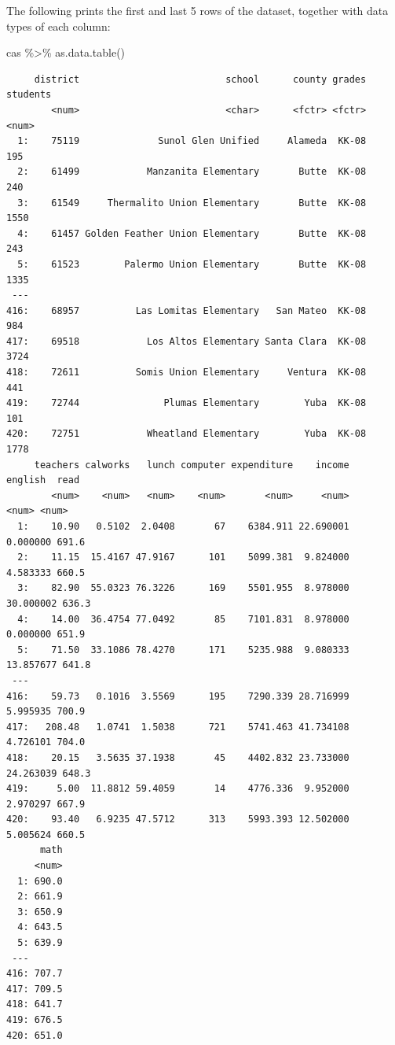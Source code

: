 \documentclass[
  12pt,
  letterpaper,
]{scrbook}
\newenvironment{Shaded}{\begin{snugshade}}{\end{snugshade}}
\newcommand{\FunctionTok}[1]{\textcolor[rgb]{0.28,0.35,0.67}{#1}}
\newcommand{\NormalTok}[1]{\textcolor[rgb]{0.00,0.23,0.31}{#1}}
\newcommand{\SpecialCharTok}[1]{\textcolor[rgb]{0.37,0.37,0.37}{#1}}
\theoremstyle{definition}
\theoremstyle{plain}
\theoremstyle{remark}
\begin{document}
The following prints the first and last 5 rows of the dataset, together
with data types of each column:

\begin{Shaded}
\begin{Highlighting}[]
\NormalTok{cas }\SpecialCharTok{\%\textgreater{}\%} \FunctionTok{as.data.table}\NormalTok{()}
\end{Highlighting}
\end{Shaded}

\begin{verbatim}
     district                          school      county grades students
        <num>                          <char>      <fctr> <fctr>    <num>
  1:    75119              Sunol Glen Unified     Alameda  KK-08      195
  2:    61499            Manzanita Elementary       Butte  KK-08      240
  3:    61549     Thermalito Union Elementary       Butte  KK-08     1550
  4:    61457 Golden Feather Union Elementary       Butte  KK-08      243
  5:    61523        Palermo Union Elementary       Butte  KK-08     1335
 ---                                                                     
416:    68957          Las Lomitas Elementary   San Mateo  KK-08      984
417:    69518            Los Altos Elementary Santa Clara  KK-08     3724
418:    72611          Somis Union Elementary     Ventura  KK-08      441
419:    72744               Plumas Elementary        Yuba  KK-08      101
420:    72751            Wheatland Elementary        Yuba  KK-08     1778
     teachers calworks   lunch computer expenditure    income   english  read
        <num>    <num>   <num>    <num>       <num>     <num>     <num> <num>
  1:    10.90   0.5102  2.0408       67    6384.911 22.690001  0.000000 691.6
  2:    11.15  15.4167 47.9167      101    5099.381  9.824000  4.583333 660.5
  3:    82.90  55.0323 76.3226      169    5501.955  8.978000 30.000002 636.3
  4:    14.00  36.4754 77.0492       85    7101.831  8.978000  0.000000 651.9
  5:    71.50  33.1086 78.4270      171    5235.988  9.080333 13.857677 641.8
 ---                                                                         
416:    59.73   0.1016  3.5569      195    7290.339 28.716999  5.995935 700.9
417:   208.48   1.0741  1.5038      721    5741.463 41.734108  4.726101 704.0
418:    20.15   3.5635 37.1938       45    4402.832 23.733000 24.263039 648.3
419:     5.00  11.8812 59.4059       14    4776.336  9.952000  2.970297 667.9
420:    93.40   6.9235 47.5712      313    5993.393 12.502000  5.005624 660.5
      math
     <num>
  1: 690.0
  2: 661.9
  3: 650.9
  4: 643.5
  5: 639.9
 ---      
416: 707.7
417: 709.5
418: 641.7
419: 676.5
420: 651.0
\end{verbatim}
\end{document}
